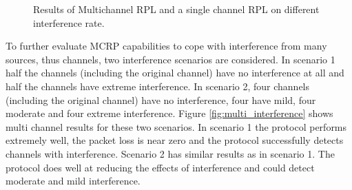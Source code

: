 \begin{figure}
\centering
{}                
\caption{Results of Multichannel RPL and a single channel RPL on different interference rate.}
\label{fig:sminterference}
\end{figure}

To further evaluate MCRP capabilities to cope with interference from many sources, thus channels, two interference scenarios are considered.
In scenario 1 half the channels (including the original channel) have no
interference at all and half the channels have extreme interference.
In scenario 2, four channels (including the original channel) have no
interference, four have mild, four moderate and four extreme interference.
Figure \ref{fig:multi_interference} shows multi channel results for these
two scenarios. In scenario 1 the protocol performs extremely well, the packet loss is near zero and the protocol successfully detects channels with interference.
Scenario 2 has similar results as in scenario 1. The protocol does well at reducing the effects of interference and could detect moderate and mild interference.

